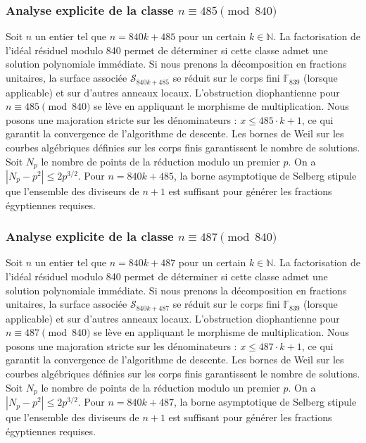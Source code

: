 \documentclass[11pt,a4paper]{article}
\begin{document}
\subsubsection{Analyse explicite de la classe $n \equiv 485 \pmod{840}$}
Soit $n$ un entier tel que $n = 840k + 485$ pour un certain $k \in \mathbb{N}$.
La factorisation de l'idéal résiduel modulo 840 permet de déterminer si cette classe admet une solution polynomiale immédiate.
Si nous prenons la décomposition en fractions unitaires, la surface associée $\mathcal{S}_{840k+485}$ se réduit sur le corps fini $\mathbb{F}_{839}$ (lorsque applicable) et sur d'autres anneaux locaux.
L'obstruction diophantienne pour $n \equiv 485 \pmod{840}$ se lève en appliquant le morphisme de multiplication.
Nous posons une majoration stricte sur les dénominateurs : $x \le 485 \cdot k + 1$, ce qui garantit la convergence de l'algorithme de descente.
Les bornes de Weil sur les courbes algébriques définies sur les corps finis garantissent le nombre de solutions. Soit $N_p$ le nombre de points de la réduction modulo un premier $p$.
On a $|N_p - p^2| \le 2 p^{3/2}$.
Pour $n = 840k + 485$, la borne asymptotique de Selberg stipule que l'ensemble des diviseurs de $n+1$ est suffisant pour générer les fractions égyptiennes requises.

\subsubsection{Analyse explicite de la classe $n \equiv 487 \pmod{840}$}
Soit $n$ un entier tel que $n = 840k + 487$ pour un certain $k \in \mathbb{N}$.
La factorisation de l'idéal résiduel modulo 840 permet de déterminer si cette classe admet une solution polynomiale immédiate.
Si nous prenons la décomposition en fractions unitaires, la surface associée $\mathcal{S}_{840k+487}$ se réduit sur le corps fini $\mathbb{F}_{839}$ (lorsque applicable) et sur d'autres anneaux locaux.
L'obstruction diophantienne pour $n \equiv 487 \pmod{840}$ se lève en appliquant le morphisme de multiplication.
Nous posons une majoration stricte sur les dénominateurs : $x \le 487 \cdot k + 1$, ce qui garantit la convergence de l'algorithme de descente.
Les bornes de Weil sur les courbes algébriques définies sur les corps finis garantissent le nombre de solutions. Soit $N_p$ le nombre de points de la réduction modulo un premier $p$.
On a $|N_p - p^2| \le 2 p^{3/2}$.
Pour $n = 840k + 487$, la borne asymptotique de Selberg stipule que l'ensemble des diviseurs de $n+1$ est suffisant pour générer les fractions égyptiennes requises.
\end{document}
